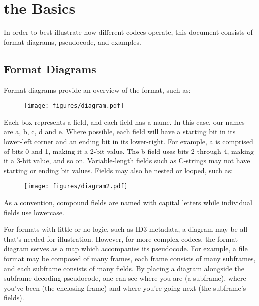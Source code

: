 
\chapter{the Basics}

In order to best illustrate how different codecs operate,
this document consists of format diagrams, pseudocode,
and examples.

\section{Format Diagrams}

Format diagrams provide an overview of the format, such as:
\begin{figure}[h]
  \texttt{[image: figures/diagram.pdf]}
\end{figure}
\par
\noindent
Each box represents a field, and each field has a name.
In this case, our names are a, b, c, d and e.
Where possible, each field will have a starting bit
in its lower-left corner and an ending bit in its lower-right.
For example, a is comprised of bits 0 and 1, making it a 2-bit value.
The b field uses bits 2 through 4, making it a 3-bit value, and so on.
Variable-length fields such as C-strings may not have starting or ending
bit values.
Fields may also be nested or looped, such as:
\begin{figure}[h]
  \texttt{[image: figures/diagram2.pdf]}
\end{figure}
\par
\noindent
As a convention, compound fields are named with capital letters
while individual fields use lowercase.
\par
For formats with little or no logic, such as ID3 metadata,
a diagram may be all that's needed for illustration.
However, for more complex codecs, the format diagram serves as a map
which accompanies its pseudocode.
For example, a file format may be composed of many frames, each frame
consists of many subframes, and each subframe consists of many fields.
By placing a diagram alongside the subframe decoding pseudocode,
one can see where you are (a subframe),
where you've been (the enclosing frame)
and where you're going next (the subframe's fields).

